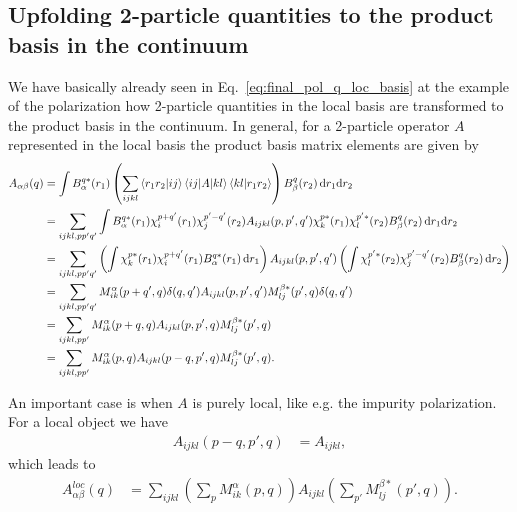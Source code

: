 \documentclass[12pt,a4paper]{scrartcl}
\numberwithin{equation}{section}
\begin{document}
\subsection{Upfolding 2-particle quantities to the product basis in the continuum}
We have basically already seen in Eq.~\eqref{eq:final_pol_q_loc_basis}
at the example of the polarization how 2-particle quantities in the 
local basis are transformed to the product basis in the continuum.
In general, for a 2-particle operator $A$ represented in the local
basis the product basis matrix elements are given by
\begin{align}
 A_{\alpha\beta}(q)
 &= \int B^{q*}_{\alpha}(r_1) \left( \sum_{ijkl}
          \braket{r_1r_2 | ij} \braket{ij|A|kl} \braket{kl|r_1r_2} \right)
          B^q_{\beta}(r_2) \, \mathrm{d}r_1\mathrm{d}r_2 \\
 &= \sum_{ijkl,pp'q'}\int B^{q*}_{\alpha}(r_1)
         \chi^{p+q'}_{i}(r_1)\chi^{p'-q'}_{j}(r_2) 
           A_{ijkl}(p,p',q') \chi^{p*}_{k}(r_1) \chi^{p'*}_{l}(r_2)
          B^q_{\beta}(r_2) \, \mathrm{d}r_1\mathrm{d}r_2 \\
%
&= \sum_{ijkl,pp'q'} \left(\int \chi^{p*}_{k}(r_1) \chi^{p+q'}_{i}(r_1) B^{q*}_{\alpha}(r_1) \, \mathrm{d}r_1 \right)
           A_{ijkl}(p,p',q')  
          \left( \int \chi^{p'*}_{l}(r_2) \chi^{p'-q'}_{j}(r_2)B^q_{\beta}(r_2) \, \mathrm{d}r_2 \right) \\
%
&= \sum_{ijkl,pp'q'}
        M^{\alpha}_{ik}(p+q',q)\delta(q,q')
         A_{ijkl}(p,p',q') M^{\beta*}_{lj}(p',q)\delta(q,q') \\
%
&= \sum_{ijkl,pp'}
        M^{\alpha}_{ik}(p+q,q)
         A_{ijkl}(p,p',q) M^{\beta*}_{lj}(p',q) \\
%
&= \sum_{ijkl,pp'}
        M^{\alpha}_{ik}(p,q)
         A_{ijkl}(p-q,p',q) M^{\beta*}_{lj}(p',q).
\end{align}

An important case is when $A$ is purely local, like e.g.
 the impurity polarization. For a local object we have
\begin{align}
 A_{ijkl}(p-q,p',q)
 &= A_{ijkl} ,
\end{align}
which leads to
\begin{align}
 A^{loc}_{\alpha\beta}(q)
%
&= \sum_{ijkl}
        \left( \sum_p M^{\alpha}_{ik}(p,q) \right)
         A_{ijkl}
        \left( \sum_{p'} M^{\beta*}_{lj}(p',q) \right).
\end{align}
\end{document}
